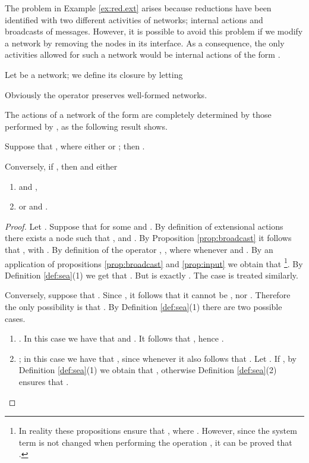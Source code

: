 \documentclass{LMCS}
\begin{document}
The problem in Example \ref{ex:red.ext} arises because reductions 
have been identified with two different activities of 
networks; internal actions and broadcasts of messages. 
However, it is possible to avoid this problem if we 
modify a network  by removing the nodes in its 
interface. As a consequence, the only activities allowed 
for such a network would be internal actions of the 
form .

\begin{defi}
\label{def:net.closure}
Let  be a network; we define its closure 
 by letting 

\end{defi}
\noindent 
Obviously the operator  preserves well-formed networks.

The actions of a network of the form  are completely 
determined by those performed by , as the following result shows. 
\begin{prop}
\label{prop:ext.closure}
Suppose that , where 
either  or ; 
then . 

Conversely, if , then 
 and either 
\begin{enumerate}[label=(\roman*)]
\item  and , 
\item or  and .
\end{enumerate}
\end{prop}

\begin{proof}
Let . 
Suppose that  
for some  and . 
By definition of extensional actions there exists a node  
such that , and 
. 
By Proposition \ref{prop:broadcast} it follows that 
, with . 
By definition of the operator , 
, where 
  whenever 
 and .
By an application of propositions \ref{prop:broadcast} and 
\ref{prop:input} we obtain that \footnote{In reality these propositions ensure that 
, where . 
However, since the system term  is not changed when performing 
the operation , 
it can be proved that .}. By 
Definition \ref{def:sea}(1) we get 
that . 
But  is exactly .
The case  is 
treated similarly.

Conversely, suppose that . Since , 
it follows that it cannot be , nor . 
Therefore the only possibility is that . By Definition 
\ref{def:sea}(1) there are two possible cases. 

\begin{enumerate}
\item . In this 
case we have that  
and . 
It follows that , 
hence .

\item ; in this 
case we have that , 
since whenever  it also 
follows that . Let 
. 
If , by Definition \ref{def:sea}(1) 
we obtain that , 
otherwise Definition \ref{def:sea}(2) ensures that 
.\qedhere
\end{enumerate}

\end{proof}
\end{document}
